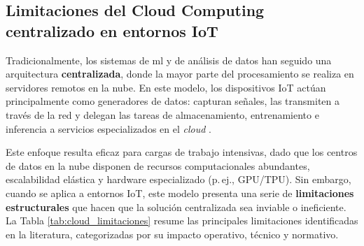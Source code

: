 \documentclass{report}
\begin{document}
\subsection{Limitaciones del Cloud Computing centralizado en entornos IoT}

Tradicionalmente, los sistemas de \gls{ml} y de análisis de datos han seguido una arquitectura \textbf{centralizada}, donde la mayor parte del procesamiento se realiza en servidores remotos en la nube. En este modelo, los dispositivos IoT actúan principalmente como generadores de datos: capturan señales, las transmiten a través de la red y delegan las tareas de almacenamiento, entrenamiento e inferencia a servicios especializados en el \textit{cloud} \cite{shi2016edge}.

Este enfoque resulta eficaz para cargas de trabajo intensivas, dado que los centros de datos en la nube disponen de recursos computacionales abundantes, escalabilidad elástica y hardware especializado (p.\,ej., GPU/TPU). Sin embargo, cuando se aplica a entornos IoT, este modelo presenta una serie de \textbf{limitaciones estructurales} que hacen que la solución centralizada sea inviable o ineficiente. La Tabla \ref{tab:cloud_limitaciones} resume las principales limitaciones identificadas en la literatura, categorizadas por su impacto operativo, técnico y normativo.
\end{document}
